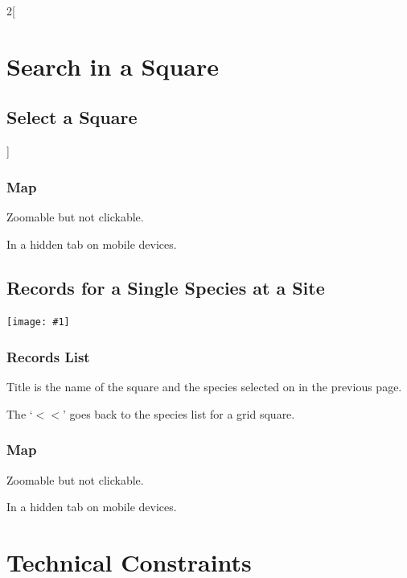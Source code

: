 \documentclass[a4paper,12pt,landscape]{article}
\newcommand{\wireframe}[1]{\texttt{[image: \#1]}\clearpage}
\begin{document}
\begin{multicols*}{2}[%
  \section{Search in a Square}%
  \subsection{Select a Square}%
]
\subsubsection*{Map}

\begin{todolist}
  \item Zoomable but not clickable.
  \item In a hidden tab on mobile devices.
\end{todolist}

\clearpage

\subsection{Records for a Single Species at a Site}

\wireframe{./wireframes/Records__SingleSpeciesForSquare.png}%

\subsubsection*{Records List}

\begin{todolist}
  \item Title is the name of the square and the species selected on in the previous page.
  \item The `$<<$' goes back to the species list for a grid square.
\end{todolist}

\subsubsection*{Map}

\begin{todolist}
  \item Zoomable but not clickable.
  \item In a hidden tab on mobile devices.
\end{todolist}

\clearpage
\end{multicols*}

\section{Technical Constraints}%

\end{document}
